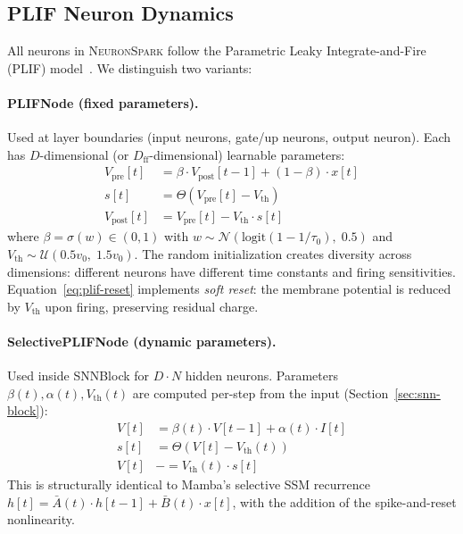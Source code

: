 \documentclass[10pt,twocolumn]{article}
\newcommand{\model}{\textsc{NeuronSpark}}
\newcommand{\vpost}{V_{\text{post}}}
\newcommand{\vpre}{V_{\text{pre}}}
\newcommand{\vth}{V_{\text{th}}}
\begin{document}
\subsection{PLIF Neuron Dynamics}
\label{sec:plif}

All neurons in \model{} follow the Parametric Leaky Integrate-and-Fire (PLIF) model~\citep{fang2021incorporating}.
We distinguish two variants:

\paragraph{PLIFNode (fixed parameters).}
Used at layer boundaries (input neurons, gate/up neurons, output neuron).
Each has $D$-dimensional (or $D_{\text{ff}}$-dimensional) learnable parameters:
\begin{align}
    \vpre[t] &= \beta \cdot \vpost[t-1] + (1-\beta) \cdot x[t] \label{eq:plif-charge} \\
    s[t] &= \Theta(\vpre[t] - \vth) \label{eq:plif-fire} \\
    \vpost[t] &= \vpre[t] - \vth \cdot s[t] \label{eq:plif-reset}
\end{align}
where $\beta = \sigma(w) \in (0,1)$ with $w \sim \mathcal{N}(\text{logit}(1 - 1/\tau_0),\; 0.5)$ and $\vth \sim \mathcal{U}(0.5 v_0,\; 1.5 v_0)$.
The random initialization creates diversity across dimensions: different neurons have different time constants and firing sensitivities.
Equation~\eqref{eq:plif-reset} implements \emph{soft reset}: the membrane potential is reduced by $\vth$ upon firing, preserving residual charge.

\paragraph{SelectivePLIFNode (dynamic parameters).}
Used inside SNNBlock for $D \cdot N$ hidden neurons.
Parameters $\beta(t), \alpha(t), \vth(t)$ are computed per-step from the input (Section~\ref{sec:snn-block}):
\begin{align}
    V[t] &= \beta(t) \cdot V[t-1] + \alpha(t) \cdot I[t] \label{eq:selective-charge} \\
    s[t] &= \Theta(V[t] - \vth(t)) \label{eq:selective-fire} \\
    V[t] &\mathrel{-}= \vth(t) \cdot s[t] \label{eq:selective-reset}
\end{align}
This is structurally identical to Mamba's selective SSM recurrence $h[t] = \bar{A}(t) \cdot h[t-1] + \bar{B}(t) \cdot x[t]$, with the addition of the spike-and-reset nonlinearity.
\end{document}
